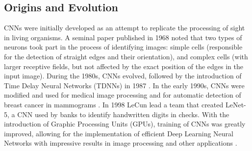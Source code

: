 \subsection{Origins and Evolution}
\label{sec:convolution:convolutionalneuralnetworks:originsandevolution}
CNNs were initially developed as an attempt to replicate the processing of sight in living organisms.\newline
A seminal paper published in 1968 \citep{Hubel1968} noted that two types of neurons took part in the process of identifying images: simple cells (responsible for the detection of straight edges and their orientation), and complex cells (with larger receptive fields, but not affected by the exact position of the edges in the input image).\newline
During the 1980s, CNNs evolved, followed by the introduction of Time Delay Neural Networks (TDNNs) in 1987 \citep{Waibel1989}.\newline
In the early 1990s, CNNs were modified and used for medical image processing and for automatic detection of breast cancer in mammograms \citep{Zang1994}.\newline
In 1998 LeCun lead a team that created LeNet-5, a CNN used by banks to identify handwritten digits in checks.\newline
With the introduction of Graphic Processing Units (GPUs), training of CNNs was greatly improved, allowing for the implementation of efficient Deep Learning Neural Networks with impressive results in image processing and other applications  \citep{Ciresan2013}.

